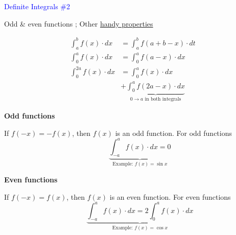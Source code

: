 \documentclass[14pt,fleqn]{extarticle}
\begin{document}
\textcolor{blue}{Definite Integrals \#2} 

Odd \& even functions ; Other
\underline{handy properties}

\newcard 
\begin{align}
	\int_a^b f(x)\cdot dx &= \int_a^b f \left(a+b-x \right)\cdot dt \\[-30pt]
	\int_0^a f(x)\cdot dx &= \int_0^a f \left(a-x \right)\cdot dx \\[-10pt]
	\int_0^{2a}f(x)\cdot dx &= \int_0^a f(x)\cdot dx \\[-10pt]
	&+ \underbrace{\int_0^a f \left(2a-x \right)\cdot dx}_{0\to a \text{ in both integrals}}
\end{align}

\textbf{Odd functions} 

If $f(-x) = -f(x)$, then $f(x)$ is an odd function.
For odd functions
\[ \qquad \underbrace{\int_{-a}^a f(x)\cdot dx = 0}_{\text{Example: }f(x) = \sin x} \]

\textbf{Even functions} 

If $f(-x) = f(x)$, then $f(x)$ is an even function. For even functions
\[ \qquad \underbrace{\int_{-a}^a f(x)\cdot dx = 2\int_0^a f(x)\cdot dx}_{\text{Example: }f(x) = \cos x}\]
\end{document}

